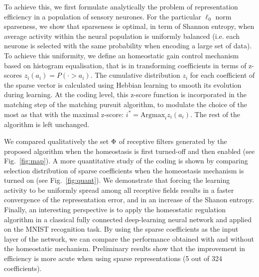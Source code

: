 {To achieve this, we first formulate analytically the problem of representation efficiency in a population of sensory neurones. For the particular $\ell_0$ norm sparseness, we show that sparseness is optimal, in term of Shannon entropy, when average activity within the neural population is uniformly balanced (i.e. each neurone is selected with the same probability when encoding a large set of data). To achieve this uniformity, we define an homeostatic gain control mechanism based on histogram equalisation, that is in transforming coefficients in terms of z-scores $z_i(a_i) = P( \cdot > a_i)$. The cumulative distribution $z_i$ for each coefficient of the sparse vector is calculated using Hebbian learning to smooth its evolution during learning. At the coding level, this z-score function is incorporated in the matching step of the matching pursuit algorithm, to modulate the choice of the most  as that with the maximal z-score: $i^\ast = \mathrm{Argmax}_i z_i(a_i)$. The rest of the algorithm is left unchanged.

We compared qualitatively the set $\Phi$ of receptive filters generated by the proposed algorithm when the homeostasis is first turned-off and then enabled  (see Fig.~\ref{fig:map}). A more quantitative study of the coding is shown by comparing selection distribution of sparse coefficients when the homeostasis mechanism is turned on (see Fig.~\ref{fig:quant}). We demonstrate that forcing the learning activity to be uniformly spread among all receptive fields results in a faster convergence of the representation error, and in an increase of the Shanon entropy. Finally, an interesting perspective is to apply the homeostatic regulation algorithm in a classical fully connected deep-learning neural network and applied on the MNIST recognition task. By using the sparse coefficients as the input layer of the network, we can compare the performance obtained with and without the homeostatic mechanism. Preliminary results show that the improvement in efficiency is more acute when using sparse representations (5 out of 324 coefficients).
}%

